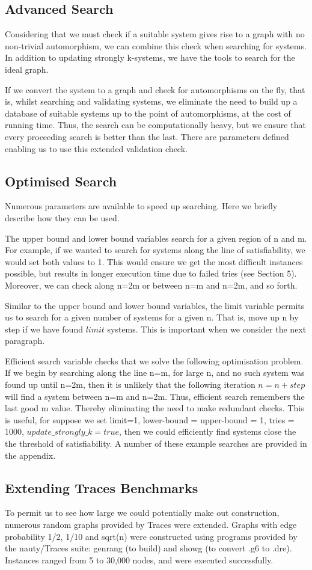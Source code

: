 \subsection{Advanced Search}
Considering that we must check if a suitable system gives rise to a graph with no non-trivial automorphism, we can combine this check when searching for systems. In addition to updating strongly k-systems, we have the tools to search for the ideal graph.
\par
If we convert the system to a graph and check for automorphisms on the fly, that is, whilst searching and validating systems, we eliminate the need to build up a database of suitable systems up to the point of automorphisms, at the cost of running time. Thus, the search can be computationally heavy, but we ensure that every proceeding search is better than the last. There are parameters defined enabling us to use this extended validation check.

\subsection{Optimised Search}
Numerous parameters are available to speed up searching. Here we briefly describe how they can be used.
\par
The upper bound and lower bound variables search for a given region of n and m. For example, if we wanted to search for systems along the line of satisfiability, we would set both values to 1. This would ensure we get the most difficult instances possible, but results in longer execution time due to failed tries (see Section 5). Moreover, we can check along n=2m or between n=m and n=2m, and so forth.
\par
Similar to the upper bound and lower bound variables, the limit variable permits us to search for a given number of systems for a given n. That is, move up n by step if we have found $limit$ systems. This is important when we consider the next paragraph.
\par
Efficient search variable checks that we solve the following optimisation problem. If we begin by searching along the line n=m, for large n, and no such system was found up until n=2m, then it is unlikely that the following iteration $n=n+step$ will find a system between n=m and n=2m. Thus, efficient search remembers the last good m value. Thereby eliminating the need to make redundant checks. This is useful, for suppose we set limit=1, lower-bound = upper-bound = 1, tries = 1000, $update\_strongly\_k = true$, then we could efficiently find systems close the the threshold of satisfiability. A number of these example searches are provided in the appendix. 
 \newpage
\subsection{Extending Traces Benchmarks}
To permit us to see how large we could potentially make out construction, numerous random graphs provided by Traces were extended. Graphs with edge probability 1/2, 1/10 and sqrt(n) were constructed using programs provided by the nauty/Traces suite: genrang (to build) and showg (to convert .g6 to .dre). Instances ranged from 5 to 30,000 nodes, and were executed successfully.
